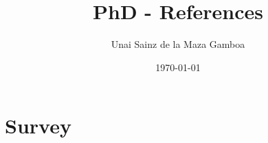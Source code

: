 \documentclass[a4paper, 11pt]{article}
\title{PhD - References}
\author{Unai Sainz de la Maza Gamboa}
\date{\today}
\begin{document}
\maketitle
\tableofcontents
\clearpage

\section{Survey}

% 
% 
% 



\end{document}

